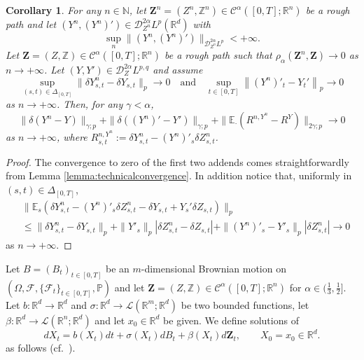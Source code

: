 \documentclass[11pt,a4paper]{article}
\newcommand{\R}{\mathbb{R}}
\newcommand{\E}{\mathbb{E}}
\theoremstyle{plain}
\newtheorem{coroll}[defn]{Corollary}
\begin{document}
\begin{coroll} \label{coroll:technicalconvergence}
    For any $n\in \mathbb{N}$, let $\mathbf{Z}^n = (Z^n, \mathbb{Z}^n) \in \mathscr{C}^{\alpha}([0,T];\R^n)$ be a rough path and let $( Y^n, (Y^n)') \in \mathscr{D}^{2 \alpha}_{Z^n} L^{p}(\R^d)$ with
    \begin{equation*}
        \sup_n \| ( Y^n, (Y^n)')\|_{\mathscr{D}^{2\alpha}_{Z^n} L^{p}} < + \infty . 
    \end{equation*}
  Let $\mathbf{Z} = (Z, \mathbb{Z}) \in \mathscr{C}^{\alpha}([0,T];\R^n)$ be a rough path such that $\rho_{\alpha} (\mathbf{Z}^n, \mathbf{Z})\rightarrow 0$ as $n \rightarrow + \infty$.
  Let $(Y, Y') \in \mathscr{D}^{2
  \alpha}_Z L^{p, q}$ and assume $$\sup_{(s, t) \in \Delta_{[0, T]}} \|
  \delta Y^n_{s, t} - \delta Y_{s, t} \|_p
  \rightarrow 0 \quad \text{and} \quad \sup_{t \in [0, T]} \left\| (Y^n)'_t - Y_t' \right\|_p
  \rightarrow 0$$ as $n \rightarrow + \infty$. Then, for any $\gamma < \alpha$,
  \begin{equation*}
      \|\delta (Y^n-Y)\|_{\gamma;p} + \|\delta ((Y^n)'-Y')\|_{\gamma;p} + \|\E_\cdot (R^{n,Y^n}-R^Y)\|_{2\gamma;p} \to 0
  \end{equation*} as $n \to +\infty$, where $R^{n,Y^n}_{s,t}:=\delta Y^n_{s,t}-(Y^n)'_s\delta Z^n_{s,t}$.
\end{coroll} 
\begin{proof}   
    The convergence to zero of the first two addends comes straightforwardly from Lemma \ref{lemma:technicalconvergence}. In addition notice that, uniformly in $(s,t)\in \Delta_{[0,T]}$, \begin{equation*} \begin{aligned}
        &\|\E_s(\delta Y^n_{s,t} - (Y^n)'_s\delta Z^n_{s,t} - \delta Y_{s,t} + Y_s'\delta Z_{s,t})\|_p \\
        &\le \|\delta Y^n_{s,t}-\delta Y_{s,t}\|_p + \|Y'_s\|_p |\delta Z^n_{s,t}-\delta Z_{s,t}| + \|(Y^n)'_s-Y'_s\|_p |\delta Z^n_{s,t}| \rightarrow 0
    \end{aligned}
    \end{equation*} as $n\to +\infty$.    
\end{proof}

Let $B=(B_t)_{t\in [0,T]}$ be an $m$-dimensional Brownian motion on $(\Omega,\mathcal{F},\{\mathcal{F}_t\}_{t\in [0,T]},\mathbb{P})$ and let $\mathbf{Z}=(Z,\mathbb{Z})\in \mathscr{C}^\alpha([0,T];\R^n)$ for $\alpha\in (\frac{1}{3},\frac{1}{2}]$. 
Let $b:\R^d \to \R^d$ and $\sigma:\R^d \to \mathscr{L}(\R^m;\R^d)$ be two bounded functions, let $\beta: \R^d \to \mathscr{L}(\R^n;\R^d)$ and let $x_0 \in \R^d$ be given. We define solutions of
\begin{equation} \label{eq:RSDE}
dX_t=b(X_t)dt+\sigma(X_t)dB_t+\beta(X_t)d\mathbf{Z}_t, \qquad X_0 = x_0 \in \R^d.
\end{equation} 
as follows (cf.\ \cite[Definition 4.2]{FHL21}).
\end{document}

